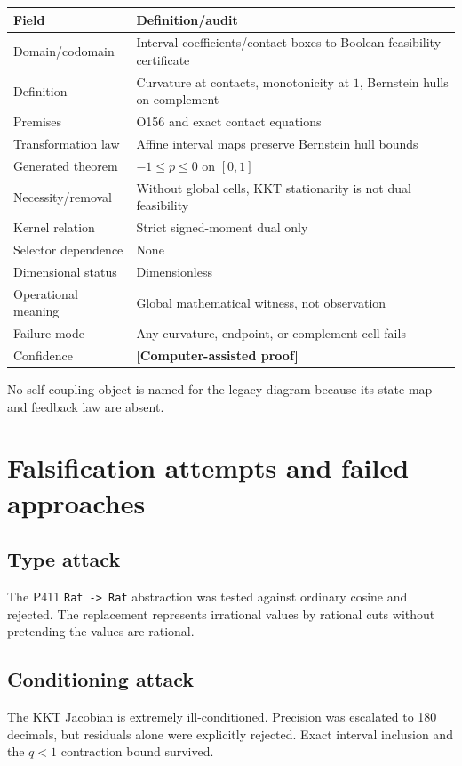 \documentclass[11pt,a4paper]{article}
\newcommand{\status}[1]{\textbf{[#1]}}
\begin{document}
\begin{longtable}{p{}p{}}
\toprule
Field & Definition/audit\\\midrule
Domain/codomain & Interval coefficients/contact boxes to Boolean feasibility certificate\\
Definition & Curvature at contacts, monotonicity at $1$, Bernstein hulls on complement\\
Premises & O156 and exact contact equations\\
Transformation law & Affine interval maps preserve Bernstein hull bounds\\
Generated theorem & $-1\le p\le0$ on $[0,1]$\\
Necessity/removal & Without global cells, KKT stationarity is not dual feasibility\\
Kernel relation & Strict signed-moment dual only\\
Selector dependence & None\\
Dimensional status & Dimensionless\\
Operational meaning & Global mathematical witness, not observation\\
Failure mode & Any curvature, endpoint, or complement cell fails\\
Confidence & \status{Computer-assisted proof}\\
\bottomrule
\end{longtable}

No self-coupling object is named for the legacy diagram because its state map
and feedback law are absent.

\section{Falsification attempts and failed approaches}

\subsection{Type attack}
The P411 \texttt{Rat -> Rat} abstraction was tested against ordinary cosine
and rejected. The replacement represents irrational values by rational cuts
without pretending the values are rational.

\subsection{Conditioning attack}
The KKT Jacobian is extremely ill-conditioned. Precision was escalated to 180
decimals, but residuals alone were explicitly rejected. Exact interval
inclusion and the $q<1$ contraction bound survived.
\end{document}
